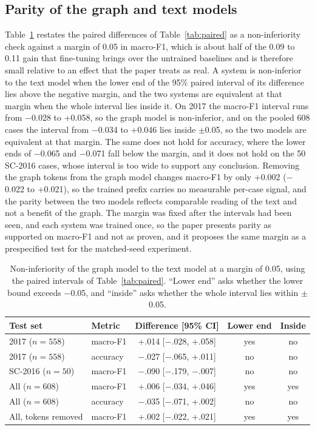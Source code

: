 \documentclass[journal]{IEEEtran}
\begin{document}
\subsection{Parity of the graph and text models}\label{sec:parity}
Table~\ref{tab:parity} restates the paired differences of Table~\ref{tab:paired} as a non-inferiority check against a margin of 0.05 in macro-F1, which is about half of the 0.09 to 0.11 gain that fine-tuning brings over the untrained baselines and is therefore small relative to an effect that the paper treats as real. A system is non-inferior to the text model when the lower end of the 95\% paired interval of its difference lies above the negative margin, and the two systems are equivalent at that margin when the whole interval lies inside it. On 2017 the macro-F1 interval runs from $-$0.028 to +0.058, so the graph model is non-inferior, and on the pooled 608 cases the interval from $-$0.034 to +0.046 lies inside $\pm$0.05, so the two models are equivalent at that margin. The same does not hold for accuracy, where the lower ends of $-$0.065 and $-$0.071 fall below the margin, and it does not hold on the 50 SC-2016 cases, whose interval is too wide to support any conclusion. Removing the graph tokens from the graph model changes macro-F1 by only +0.002 ($-$0.022 to +0.021), so the trained prefix carries no measurable per-case signal, and the parity between the two models reflects comparable reading of the text and not a benefit of the graph. The margin was fixed after the intervals had been seen, and each system was trained once, so the paper presents parity as supported on macro-F1 and not as proven, and it proposes the same margin as a prespecified test for the matched-seed experiment.

\begin{table}[!t]\centering\footnotesize
\setlength{\tabcolsep}{3pt}
\caption{Non-inferiority of the graph model to the text model at a margin of 0.05, using the paired intervals of Table~\ref{tab:paired}. ``Lower end'' asks whether the lower bound exceeds $-$0.05, and ``inside'' asks whether the whole interval lies within $\pm$0.05.}\label{tab:parity}
\begin{tabular}{@{}llccc@{}}\toprule
Test set & Metric & Difference [95\% CI] & Lower end & Inside\\\midrule
2017 ($n=558$) & macro-F1 & +.014 [$-$.028, +.058] & yes & no\\
2017 ($n=558$) & accuracy & $-$.027 [$-$.065, +.011] & no & no\\
SC-2016 ($n=50$) & macro-F1 & $-$.090 [$-$.179, $-$.007] & no & no\\
All ($n=608$) & macro-F1 & +.006 [$-$.034, +.046] & yes & yes\\
All ($n=608$) & accuracy & $-$.035 [$-$.071, +.002] & no & no\\
All, tokens removed & macro-F1 & +.002 [$-$.022, +.021] & yes & yes\\\bottomrule
\end{tabular}\end{table}
\end{document}
